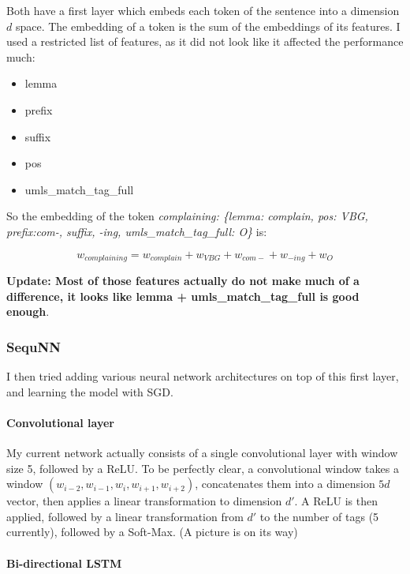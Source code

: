 \documentclass[10pt,a4paper]{article}
\begin{document}
  Both have a first layer which embeds each token of the sentence into a dimension $d$ space. The embedding of a token is the sum of the embeddings of its features. I used a restricted list of features, as it did not look like it affected the performance much:
  
  \begin{itemize}
  \item lemma
  \item prefix
  \item suffix
  \item pos
  \item umls\_match\_tag\_full
  \end{itemize}
  
  So the embedding of the token {\sl{ complaining: \{lemma: complain, pos: VBG, prefix:com-, suffix, -ing, umls\_match\_tag\_full: O\}}} is:
  
  $$w_{complaining} = w_{complain} + w_{VBG} + w_{com-} + w_{-ing} + w_{O}$$

 {\bf{Update: Most of those features actually do not make much of a difference, it looks like lemma + umls\_match\_tag\_full is good enough}}.

\subsubsection{SequNN}

  I then tried adding various neural network architectures on top of this first layer, and learning the model with SGD.

  \paragraph{Convolutional layer}
  
  My current network actually consists of a single convolutional layer with window size 5, followed by a ReLU. To be perfectly clear, a convolutional window takes a window $(w_{i-2}, w_{i-1}, w_{i}, w_{i+1}, w_{i+2})$, concatenates them into a dimension $5d$ vector, then applies a linear transformation to dimension $d'$. A ReLU is then applied, followed by a linear transformation from $d'$ to the number of tags (5 currently), followed by a Soft-Max. (A picture is on its way)

  \paragraph{Bi-directional LSTM}
\end{document}

